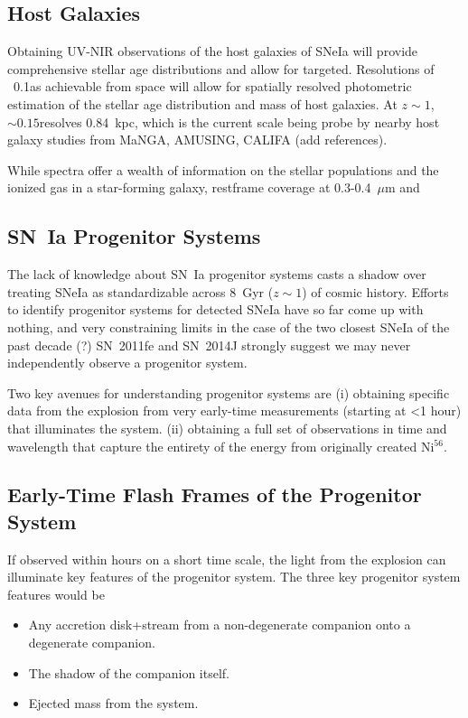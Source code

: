 \documentclass[12pt,preprint]{aastex}
\newcommand{\tbd}{{\color{red}}}
\begin{document}
\subsection{Host Galaxies}

Obtaining UV-NIR observations of the host galaxies of SNeIa will provide comprehensive stellar age distributions and allow for targeted.  Resolutions of ~0.1\arcsec as achievable from space will allow for spatially resolved photometric estimation of the stellar age distribution and mass of host galaxies.  At $z\sim1$, $\sim0.15$\arcsec resolves 0.84~kpc, which is the current scale being probe by nearby host galaxy studies from MaNGA, AMUSING, CALIFA ({\tbd add references}).

While spectra offer a wealth of information on the stellar populations and the ionized gas in a star-forming galaxy, restframe coverage at 0.3-0.4~$\mu$m and

\subsection{SN~Ia Progenitor Systems}

The lack of knowledge about SN~Ia progenitor systems casts a shadow over treating SNeIa as standardizable across 8~Gyr ($z\sim1$) of cosmic history.  Efforts to identify progenitor systems for detected SNeIa have so far come up with nothing, and very constraining limits in the case of the two closest SNeIa of the past decade (?) SN~2011fe \citep{Li11} and SN~2014J \citep{Nielsen14, Perez-Torres14, Goobar15, Sand16, Graur19} strongly suggest we may never independently observe a progenitor system.

Two key avenues for understanding progenitor systems are 
(i) obtaining specific data from the explosion from very early-time measurements (starting at <1 hour) that illuminates the system.
(ii) obtaining a full set of observations in time and wavelength that capture the entirety of the energy from originally created Ni$^{56}$.

\subsection{Early-Time Flash Frames of the Progenitor System}
If observed within hours on a short time scale, the light from the explosion can illuminate key features of the progenitor system.  The three key progenitor system features would be 
\begin{itemize}
\item Any accretion disk+stream from a non-degenerate companion onto a degenerate companion.
\item The shadow of the companion itself.
\item Ejected mass from the system.
\end{itemize}
\end{document}
